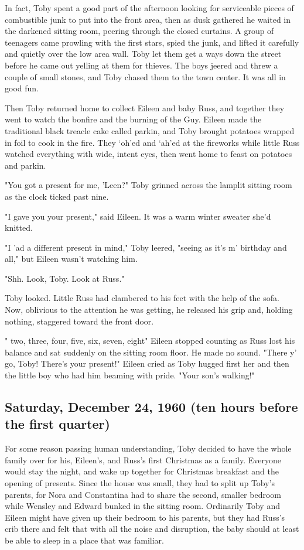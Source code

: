 In fact, Toby spent a good part of the afternoon looking for serviceable pieces of combustible junk to put into the front area, then as dusk gathered he waited in the darkened sitting room, peering through the closed curtains. A group of teenagers came prowling with the first stars, spied the junk, and lifted it carefully and quietly over the low area wall. Toby let them get a ways down the street before he came out yelling at them for thieves. The boys jeered and threw a couple of small stones, and Toby chased them to the town center. It was all in good fun.

Then Toby returned home to collect Eileen and baby Russ, and together they went to watch the bonfire and the burning of the Guy. Eileen made the traditional black treacle cake called parkin, and Toby brought potatoes wrapped in foil to cook in the fire. They `oh'ed and `ah'ed at the fireworks while little Russ watched everything with wide, intent eyes, then went home to feast on potatoes and parkin.

"You got a present for me, 'Leen?" Toby grinned across the lamplit sitting room as the clock ticked past nine.

"I gave you your present," said Eileen. It was a warm winter sweater she'd knitted.

"I 'ad a different present in mind," Toby leered, "seeing as it's m' birthday and all," but Eileen wasn't watching him.

"Shh. Look, Toby. Look at Russ."

Toby looked. Little Russ had clambered to his feet with the help of the sofa. Now, oblivious to the attention he was getting, he released his grip and, holding nothing, staggered toward the front door.

"{\el} two, three, four, five, six, seven, eight{\el}" Eileen stopped counting as Russ lost his balance and sat suddenly on the sitting room floor. He made no sound. "There y' go, Toby! There's your present!" Eileen cried as Toby hugged first her and then the little boy who had him beaming with pride. "Your son's walking!"

\subsection{Saturday, December 24, 1960 (ten hours before the first quarter)}

For some reason passing human understanding, Toby decided to have the whole family over for his, Eileen's, and Russ's first Christmas as a family. Everyone would stay the night, and wake up together for Christmas breakfast and the opening of presents. Since the house was small, they had to split up Toby's parents, for Nora and Constantina had to share the second, smaller bedroom while Wensley and Edward bunked in the sitting room. Ordinarily Toby and Eileen might have given up their bedroom to his parents, but they had Russ's crib there and felt that with all the noise and disruption, the baby should at least be able to sleep in a place that was familiar.

